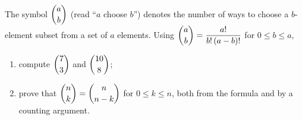 The symbol $\dbinom{a}{b}$ (read ``$a$ choose $b$'') denotes the number of ways to choose a $b$-element subset from a set of $a$ elements. Using $\dbinom ab=\dfrac{a!}{b!\,(a-b)!}$ for $0\le b\le a$,
\begin{enumerate}
\item[(a)] compute $\dbinom73$ and $\dbinom{10}{8}$;
\item[(b)] prove that $\dbinom nk=\dbinom n{n-k}$ for $0\le k\le n$, both from the formula and by a counting argument.
\end{enumerate}
